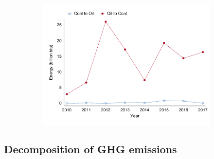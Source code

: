 \documentclass[12pt,notitlepage]{article}
\begin{document}
\begin{figure}[!htpb]
\begin{subfigure}{.49\textwidth}
 \includegraphics[scale=0.8]{../Output/Graphs/SwitchCoalOil_year.pdf}
\end{subfigure}
\end{figure}


\subsection{Decomposition of GHG emissions}
\end{document}
